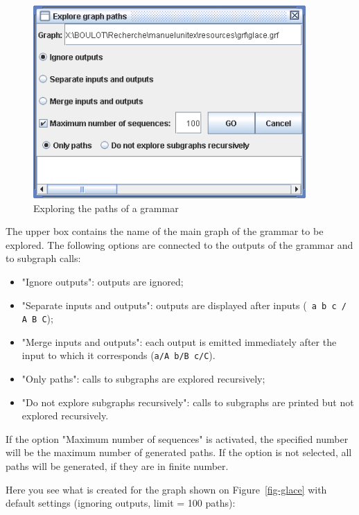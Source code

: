 \begin{figure}[!h]
\begin{center}
\includegraphics[width=10.4cm]{resources/img/fig6-18.png}
\caption{Exploring the paths of a grammar\label{fig-explore-graph-paths}}
\end{center}
\end{figure}

\bigskip
\noindent The upper box contains the name of the main graph of the grammar to be
explored. The following options are connected to the outputs of the grammar and
to subgraph calls:

\begin{itemize}
  \item "Ignore outputs": outputs are ignored;
  \item "Separate inputs and outputs": outputs are displayed after inputs
  (\verb$ a b c / A B C$);
  \item "Merge inputs and outputs": each output is emitted immediately after
  the input to which it corresponds  (\verb$a/A b/B c/C$).
  \item "Only paths": calls to subgraphs are explored recursively;
  \item "Do not explore subgraphs recursively": calls to subgraphs are printed
  but not explored recursively.
\end{itemize}

\noindent If the option "Maximum number of sequences" is activated, the
specified number will be the maximum number of generated paths. If the 
option is not selected, all
paths will be generated, if they are in finite number.

\bigskip
\noindent Here you see what is created for the graph shown on
Figure~\ref{fig-glace} with default settings (ignoring outputs, limit = 100
paths):

